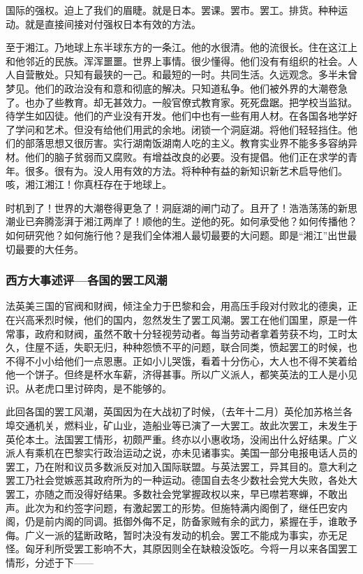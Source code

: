 国际的强权。迫上了我们的眉睫。就是日本。罢课。罢市。罢工。排货。种种运动。就是直接间接对付强权日本有效的方法。

至于湘江。乃地球上东半球东方的一条江。他的水很清。他的流很长。住在这江上和他邻近的民族。浑浑噩噩。世界上事情。很少懂得。他们没有有组织的社会。人人自营散处。只知有最狭的一己。和最短的一时。共同生活。久远观念。多半未曾梦见。他们的政治没有和意和彻底的解决。只知道私争。他们被外界的大潮卷急了。也办了些教育。却无甚效力。一般官僚式教育家。死死盘踞。把学校当监狱。待学生如囚徒。他们的产业没有开发。他们中也有一些有用人材。在各国各地学好了学问和艺术。但没有给他们用武的余地。闭锁一个洞庭湖。将他们轻轻挡住。他们的部落思想又很厉害。实行湖南饭湖南人吃的主义。教育实业界不能多多容纳异材。他们的脑子贫弱而又腐败。有增益改良的必要。没有提倡。他们正在求学的青年。很多。很有为。没人用有效的方法。将种种有益的新知识新艺术启导他们。咳，湘江湘江！你真枉存在于地球上。

时机到了！世界的大潮卷得更急了！洞庭湖的闸门动了。且开了！浩浩荡荡的新思潮业已奔腾澎湃于湘江两岸了！顺他的生。逆他的死。如何承受他？如何传播他？如何研究他？如何施行他？是我们全体湘人最切最要的大问题。即是“湘江”出世最切最要的大任务。

\subsubsection{西方大事述评—各国的罢工风潮}

法英美三国的官阀和财阀，倾注全力于巴黎和会，用高压手段对付败北的德奥，正在兴高釆烈时候，他们的国内，忽然发生了罢工风潮。罢工在他们国里，原是一件常事，政府和财阀，虽然不敢十分轻视劳动者。每当劳动者拿着劳获不均，工时太久，住屋不适，失职无归，种种怨愤不平的问题，联合同类，愤起罢工的时候，也不得不小小给他们一点恩惠。正如小儿哭饿，看着十分伤心，大人也不得不笑着给他一个饼子。但终是杯水车薪，济得甚事。所以广义派人，都笑英法的工人是小见识。从老虎口里讨碎肉，是不能够的。

此回各国的罢工风潮，英国因为在大战初了时候，（去年十二月）英伦加苏格兰各埠交通机关，燃料业，矿山业，造船业等已演了一大罢工。故此次罢工，未发生于英伦本土。法国罢工情形，初颇严重。终亦以小惠收场，没闹出什么好结果。广义派人有乘机在巴黎实行政治运动之说，亦未见诸事实。美国一部分电报电话人员的罢工，乃在附和议员多数派反对加入国际联盟。与英法罢工，异其目的。意大利之罢工乃社会觉嫉恶其政府所为的一种运动。德国自去冬少数社会党大失败，各处大罢工，亦随之而没得好结果。多数社会党掌握政权以来，早已噤若寒蝉，不敢出声。此次为和约签字问题，有激起罢工的形势。但施特满内阁倒了，继任巴安内阁，仍是前内阁的同调。抵御外侮不足，防备家贼有余的武力，紧握在手，谁敢予侮。广义一派的猛断政略，暂时决没有发动的机会。罢工不能成为事实，亦无足怪。匈牙利所受罢工影响不大，其原因则全在缺粮没饭吃。今将一月以来各国罢工情形，分述于下——

